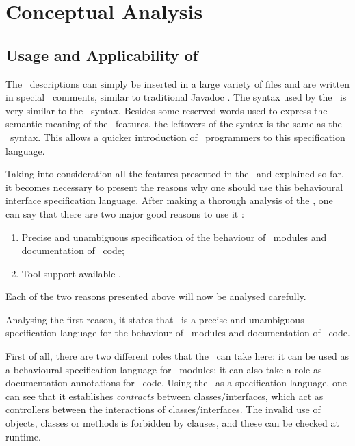 \chapter{Conceptual Analysis}
\label{sec:chapter2}

\section{Usage and Applicability of \jml}

The \jml\ descriptions can simply be inserted in a large variety of files and are written in special \java\ comments, 
similar to traditional Javadoc \cite{leavens-Baker-Ruby99b}.
The syntax used by the \jml\ is very similar to the \java\ syntax. Besides some reserved words used to express the semantic 
meaning of the \jml\ features, the leftovers of the syntax is the same as the \java\ syntax. This allows a quicker introduction of \java\ 
programmers to this specification language.

Taking into consideration all the features presented in the \jml\ and explained so far, it becomes necessary to present 
the reasons why one should use this behavioural interface specification language.
After making a thorough analysis of the \jml, one can say that there are two major good reasons to use it \cite{leavens-etal07}:
\begin{enumerate}
\item Precise and unambiguous specification of the behaviour of \java\ modules and documentation of \java\ code;
\item Tool support available \cite{leavens-Cheon-Cok05}.
\end{enumerate}
Each of the two reasons presented above will now be analysed carefully.

Analysing the first reason, it states that \jml\ is a precise and unambiguous specification language for the behaviour of \java\ 
modules and documentation of \java\ code.

First of all, there are two different roles that the \jml\ can take here: it can be used as a behavioural specification 
language for \java\ modules; it can also take a role as documentation annotations for \java\ code.
Using the \jml\ as a specification language, one can see that it establishes \textit{contracts} between classes/interfaces, which act 
as controllers between the interactions of classes/interfaces. The invalid use of objects, classes or methods is forbidden by 
clauses, and these can be checked at runtime.

